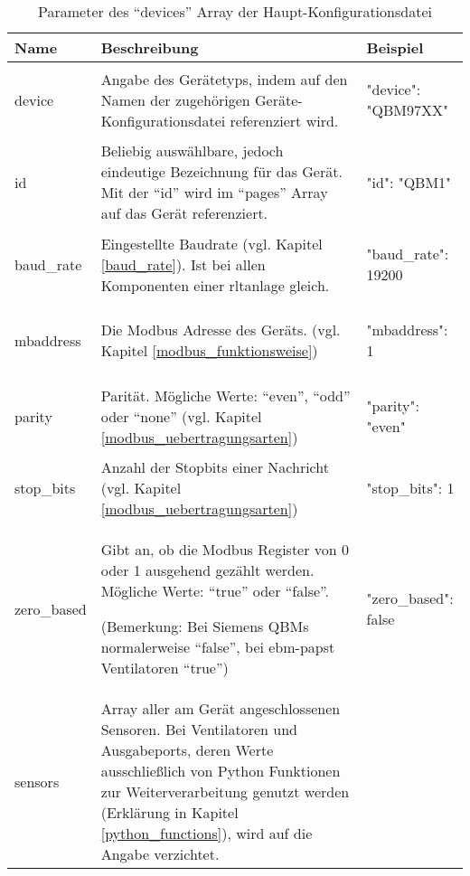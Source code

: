 \begin{enumerate}
	\begin{table}[H]
		\caption{Parameter des \enquote{devices} Array der Haupt-Konfigurationsdatei}
		\label{tab:devices_array_parameter}
		\begin{tabular}{p{} p{} | p{}}
			\toprule
			\textbf{Name} & \textbf{Beschreibung} & \textbf{Beispiel} \\
			\midrule
			device     	& Angabe des Gerätetyps, indem auf den Namen der zugehörigen Geräte-Konfigurationsdatei referenziert wird. & 	
			\begin{jsonTable}
"device": "QBM97XX"
			\end{jsonTable}  
			\\
			id         	& Beliebig auswählbare, jedoch eindeutige Bezeichnung für das Gerät. Mit der \enquote{id} wird im \enquote{pages} Array auf das Gerät referenziert.  & 	
			\begin{jsonTable}
"id": "QBM1"
			\end{jsonTable}  
			\\
			baud\_rate	& Eingestellte Baudrate (vgl. Kapitel \ref{baud_rate}). Ist bei allen Komponenten einer \acs{rltanlage} gleich. & 	
			\begin{jsonTable}
"baud_rate": 19200
			\end{jsonTable}  
			\\
			mbaddress	& Die Modbus Adresse des Geräts. (vgl. Kapitel \ref{modbus_funktionsweise}) & 	
			\begin{jsonTable}
"mbaddress": 1
			\end{jsonTable}  
			\\
			parity	& Parität. Mögliche Werte: \enquote{even}, \enquote{odd} oder \enquote{none} (vgl. Kapitel \ref{modbus_uebertragungsarten}) & 	
			\begin{jsonTable}
"parity": "even"
			\end{jsonTable}  
			\\
			stop\_bits	& Anzahl der Stopbits einer Nachricht (vgl. Kapitel \ref{modbus_uebertragungsarten}) & 	
			\begin{jsonTable}
"stop_bits": 1
			\end{jsonTable}  
			\\
			zero\_based	& Gibt an, ob die Modbus Register von 0 oder 1 ausgehend gezählt werden. Mögliche Werte: \enquote{true} oder \enquote{false}.
			
			(Bemerkung: Bei Siemens QBMs normalerweise \enquote{false}, bei ebm-papst Ventilatoren \enquote{true}) & 	
			\begin{jsonTable}
"zero_based": false
			\end{jsonTable}  
			\\
			sensors	& Array aller am Gerät angeschlossenen Sensoren. Bei Ventilatoren und Ausgabeports, deren Werte ausschließlich von Python Funktionen zur Weiterverarbeitung genutzt werden (Erklärung in Kapitel \ref{python_functions}), wird auf die Angabe verzichtet. 
			

\end{tabular}
\end{table}
\end{enumerate}
